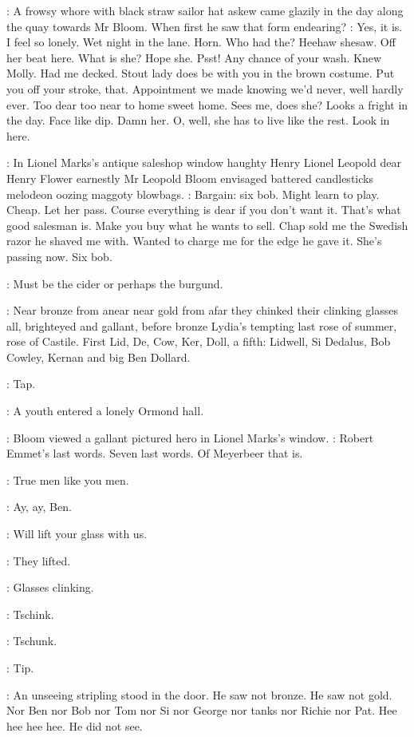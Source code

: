 :
A frowsy whore with black straw sailor hat askew came glazily in the
day along the quay towards Mr Bloom. When first he saw that form
endearing?
\BloomInt:
Yes, it is. I feel so lonely. Wet night in the lane. Horn. Who
had the? Heehaw shesaw. Off her beat here. What is she? Hope she. Psst!
Any chance of your wash. Knew Molly. Had me decked. Stout lady does be
with you in the brown costume. Put you off your stroke, that. Appointment
we made knowing we'd never, well hardly ever. Too dear too near to home
sweet home. Sees me, does she? Looks a fright in the day. Face like dip.
Damn her.
O, well, she has to live like the rest. Look in here.

:
In Lionel Marks's antique saleshop window haughty Henry Lionel
Leopold dear Henry Flower earnestly Mr Leopold Bloom envisaged
battered candlesticks melodeon oozing maggoty blowbags.
\BloomInt:
Bargain: six bob.
Might learn to play. Cheap. Let her pass. Course everything is dear if
you don't want it. That's what good salesman is. Make you buy what he
wants to sell. Chap sold me the Swedish razor he shaved me with. Wanted
to charge me for the edge he gave it. She's passing now. Six bob.

\BloomInt:
Must be the cider or perhaps the burgund.

:
Near bronze from anear near gold from afar they chinked their clinking
glasses all, brighteyed and gallant,
before bronze Lydia's tempting
last rose of summer, rose of Castile. First Lid, De, Cow, Ker, Doll, a
fifth: Lidwell, Si Dedalus, Bob Cowley, Kernan and big Ben Dollard.

\Stripling:
Tap.

:
A youth entered a lonely Ormond hall.

:
Bloom viewed a gallant pictured hero in Lionel Marks's window.
\BloomInt:
Robert Emmet's last words. Seven last words.
Of Meyerbeer that is.

\Dollard:
True men like you men.

\Simon:
Ay, ay, Ben.

\Dollard:
Will lift your glass with us.

:
They lifted.

\Stage:
Glasses clinking.

:
Tschink.

:
Tschunk.

\Stripling:
Tip.

:
An unseeing stripling stood in the door. He saw not bronze. He
saw not gold. Nor Ben nor Bob nor Tom nor Si nor George nor tanks nor
Richie nor Pat. Hee hee hee hee. He did not see.

